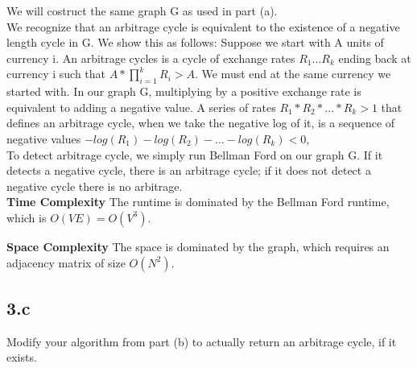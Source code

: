 \documentclass[11pt]{article}
\begin{document}
\begin{solution} We will costruct the same graph G as used in part (a).\\ 

We recognize that an arbitrage cycle is equivalent to the existence of a negative length cycle in G. We show this as follows: Suppose we start with A units of currency i. An arbitrage cycles is a cycle of exchange rates $R_1...R_k$ ending back at currency i such that $A*\prod_{i=1}^{k} R_i > A$. We must end at the same currency we started with. In our graph G, multiplying by a positive exchange rate is equivalent to adding a negative value. A series of rates $R_1*R_2*...*R_k>1$ that defines an arbitrage cycle, when we take the negative log of it, is a sequence of negative values $-log(R_1)-log(R_2)-...-log(R_k) < 0$, \\

To detect arbitrage cycle, we simply run Bellman Ford on our graph G. If it detects a negative cycle, there is an arbitrage cycle; if it does not detect a negative cycle there is no arbitrage. \\

\textbf{Time Complexity} The runtime is dominated by the Bellman Ford runtime, which is $O(VE)=O(V^3)$.

\textbf{Space Complexity} The space is dominated by the graph, which requires an adjacency matrix of size $O(N^2)$.


\end{solution}


\clearpage



\subsection *{3.c} Modify your algorithm from part (b) to actually return an arbitrage cycle, if it exists. 
\end{document}
